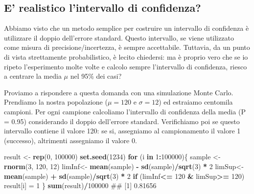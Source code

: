 \documentclass[a4paper,12pt,oneside]{book}
\newenvironment{Shaded}{\begin{snugshade}}{\end{snugshade}}
\newcommand{\KeywordTok}[1]{\textcolor[rgb]{0.13,0.29,0.53}{\textbf{#1}}}
\newcommand{\DecValTok}[1]{\textcolor[rgb]{0.00,0.00,0.81}{#1}}
\newcommand{\StringTok}[1]{\textcolor[rgb]{0.31,0.60,0.02}{#1}}
\newcommand{\ControlFlowTok}[1]{\textcolor[rgb]{0.13,0.29,0.53}{\textbf{#1}}}
\newcommand{\OperatorTok}[1]{\textcolor[rgb]{0.81,0.36,0.00}{\textbf{#1}}}
\newcommand{\NormalTok}[1]{#1}
\theoremstyle{definition}
\theoremstyle{definition}
\theoremstyle{definition}
\theoremstyle{remark}
\begin{document}
\subsection{E' realistico l'intervallo di
confidenza?}\label{e-realistico-lintervallo-di-confidenza}

Abbiamo visto che un metodo semplice per costruire un intervallo di
confidenza è utilizzare il doppio dell'errore standard. Questo
intervallo, se viene utilizzato come misura di precisione/incertezza, è
sempre accettabile. Tuttavia, da un punto di vista strettamente
probabilistico, è lecito chiedersi: ma è proprio vero che se io ripeto
l'esperimento molte volte e calcolo sempre l'intervallo di confidenza,
riesco a centrare la media \(\mu\) nel 95\% dei casi?

Proviamo a rispondere a questa domanda con una simulazione Monte Carlo.
Prendiamo la nostra popolazione (\(\mu = 120\) e \(\sigma = 12\)) ed
estraiamo centomila campioni. Per ogni campione calcoliamo l'intervallo
di confidenza della media (P = 0.95) considerando il doppio dell'errore
standard. Verifichiamo poi se questo intervallo contiene il valore 120:
se si, assegniamo al campionamento il valore 1 (successo), altrimenti
assegniamo il valore 0.

\begin{Shaded}
\begin{Highlighting}[]
\NormalTok{result <-}\StringTok{ }\KeywordTok{rep}\NormalTok{(}\DecValTok{0}\NormalTok{, }\DecValTok{100000}\NormalTok{)}
\KeywordTok{set.seed}\NormalTok{(}\DecValTok{1234}\NormalTok{)}
\ControlFlowTok{for}\NormalTok{ (i }\ControlFlowTok{in} \DecValTok{1}\OperatorTok{:}\DecValTok{100000}\NormalTok{)\{}
\NormalTok{  sample <-}\StringTok{ }\KeywordTok{rnorm}\NormalTok{(}\DecValTok{3}\NormalTok{, }\DecValTok{120}\NormalTok{, }\DecValTok{12}\NormalTok{)}
\NormalTok{  limInf<-}\StringTok{ }\KeywordTok{mean}\NormalTok{(sample) }\OperatorTok{-}\StringTok{ }\KeywordTok{sd}\NormalTok{(sample)}\OperatorTok{/}\KeywordTok{sqrt}\NormalTok{(}\DecValTok{3}\NormalTok{) }\OperatorTok{*}\StringTok{ }\DecValTok{2} 
\NormalTok{  limSup<-}\StringTok{ }\KeywordTok{mean}\NormalTok{(sample) }\OperatorTok{+}\StringTok{ }\KeywordTok{sd}\NormalTok{(sample)}\OperatorTok{/}\KeywordTok{sqrt}\NormalTok{(}\DecValTok{3}\NormalTok{) }\OperatorTok{*}\StringTok{ }\DecValTok{2}
  \ControlFlowTok{if}\NormalTok{ (limInf}\OperatorTok{<=}\StringTok{ }\DecValTok{120} \OperatorTok{&}\StringTok{ }\NormalTok{limSup}\OperatorTok{>=}\StringTok{ }\DecValTok{120}\NormalTok{) result[i] =}\StringTok{ }\DecValTok{1}
\NormalTok{\}}
\KeywordTok{sum}\NormalTok{(result)}\OperatorTok{/}\DecValTok{100000}
\NormalTok{## [1] 0.81656}
\end{Highlighting}
\end{Shaded}
\end{document}
